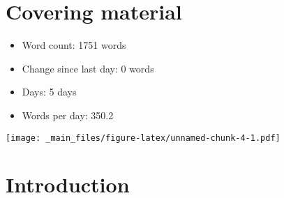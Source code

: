 \documentclass[a4paper, nobind]{templates/ociamthesis}
\begin{document}
\begin{romanpages}
  \dominitoc %

\flushbottom

\tableofcontents

\listoffigures
	\mtcaddchapter

\listoftables
  \mtcaddchapter


\end{romanpages}

\flushbottom

\hypertarget{covering-material}{%
\chapter*{Covering material}\label{covering-material}}

\adjustmtc

\begin{itemize}
\item
  Word count: 1751 words
\item
  Change since last day: 0 words
\item
  Days: 5 days
\item
  Words per day: 350.2
\end{itemize}

\texttt{[image: \_main\_files/figure-latex/unnamed-chunk-4-1.pdf]}

\hypertarget{intro-intro}{%
\chapter{Introduction}\label{intro-intro}}
\end{document}
